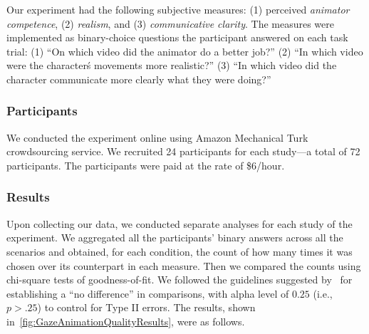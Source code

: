 Our experiment had the following subjective measures: (1) perceived \emph{animator competence}, (2) \emph{realism}, and (3) \emph{communicative clarity}. The measures were implemented as binary-choice questions the participant answered on each task trial: (1) ``On which video did the animator do a better job?'' (2) ``In which video were the character\'s movements more realistic?'' (3) ``In which video did the character communicate more clearly what they were doing?''

\subsubsection{Participants}

We conducted the experiment online using Amazon Mechanical Turk crowdsourcing service. We recruited 24 participants for each study---a total of 72 participants. The participants were paid at the rate of \$6/hour.

\subsubsection{Results}

Upon collecting our data, we conducted separate analyses for each study of the experiment. We aggregated all the participants' binary answers across all the scenarios and obtained, for each condition, the count of how many times it was chosen over its counterpart in each measure. Then we compared the counts using chi-square tests of goodness-of-fit. We followed the guidelines suggested by~\citet{julnes1989analysis} for establishing a ``no difference'' in comparisons, with alpha level of $0.25$ (i.e., $p > .25$) to control for Type II errors.
The results, shown in~\ref{fig:GazeAnimationQualityResults}, were as follows.

